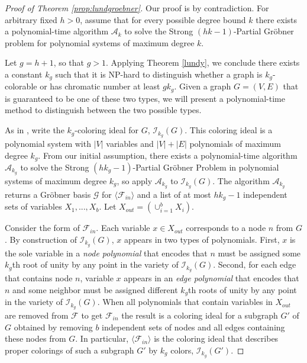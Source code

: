 \documentclass{article}
\newcommand{\A}[0]{\mathcal{A}}
\begin{document}
\begin{proof}[Proof of Theorem \ref{prop:lundgroebner}]
Our proof is by contradiction. For arbitrary fixed $h>0$, assume that for every possible degree bound $k$ there exists a polynomial-time algorithm $\A_k$ to solve the Strong $(hk-1)$\nobreakdash-Partial Gr\"{o}bner problem for polynomial systems of maximum degree $k$.

Let $g=h+1$, so that $g>1$. Applying Theorem \ref{lundy}, we conclude there exists a constant $k_g$ such that it is NP-hard to distinguish whether a graph is $k_g$-colorable or has chromatic number at least $gk_g$. Given a graph $G=(V,E)$ that is guaranteed to be one of these two types, we will present a polynomial-time method to distinguish between the two possible types.

As in \cite{deloera}, write the $k_g$-coloring ideal for $G$, $\mathcal{I}_{k_g}(G)$. This coloring ideal is a polynomial system with $|V|$ variables and $|V|+|E|$ polynomials of maximum degree $k_g$. From our initial assumption, there exists a polynomial-time algorithm $\A_{k_g}$ to solve the Strong $(hk_g-1)$\nobreakdash-Partial Gr\"{o}bner Problem in polynomial systems of maximum degree $k_g$, so apply $\A_{k_g}$ to $\mathcal{I}_{k_g}(G)$.  The algorithm $\A_{k_g}$ returns a Gr\"{o}bner basis $\mathcal{G}$ for $\langle\mathcal{F}_{in}\rangle$ and a list of at most $hk_g-1$ independent sets of variables $X_1,...,X_b$. Let $X_{out}= (\cup_{i=1}^b X_i)$.

Consider the form of $\mathcal{F}_{in}$. Each variable $x\in X_{out}$ corresponds to a node $n$ from $G$. By construction of $\mathcal{I}_{k_g}(G)$, $x$ appears in two types of polynomials. First, $x$ is the sole variable in a \emph{node polynomial} that encodes that $n$ must be assigned some $k_g$th root of unity by any point in the variety of $\mathcal{I}_{k_g}(G)$. Second, for each edge that contains node $n$, variable $x$ appears in an \emph{edge polynomial} that encodes that $n$ and some neighbor must be assigned different $k_g$th roots of unity by any point in the variety of $\mathcal{I}_{k_g}(G)$. When all polynomials that contain variables in $X_{out}$ are removed from $\mathcal{F}$ to get $\mathcal{F}_{in}$ the result is a coloring ideal for a subgraph $G'$ of $G$ obtained by removing $b$ independent sets of nodes and all edges containing these nodes from $G$. In particular, $\langle\mathcal{F}_{in}\rangle$ is the coloring ideal that describes proper colorings of such a subgraph $G'$ by $k_g$ colors, $\mathcal{I}_{k_g}(G')$.


\end{proof}
\end{document}
